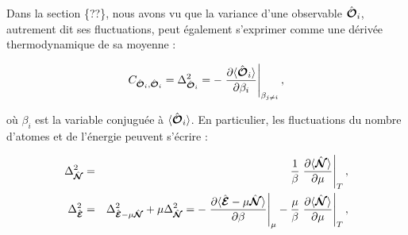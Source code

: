 


Dans la section \{??\}, nous avons vu que la variance d’une observable \( \hat{\bm{\mathcal{O}}}_i \), autrement dit ses fluctuations, peut également s’exprimer comme une dérivée thermodynamique de sa moyenne :

\begin{eqnarray*}
    C_{\hat{\bm{\mathcal{O}}}_i,\hat{\bm{\mathcal{O}}}_i} = \Delta_{\hat{\bm{\mathcal{O}}}_i}^2 = - \left. \frac{\partial \langle \hat{\bm{\mathcal{O}}}_i \rangle}{\partial \beta_i} \right|_{\beta_{j \neq i}},
\end{eqnarray*}

où \( \beta_i \) est la variable conjuguée à \( \langle \hat{\bm{\mathcal{O}}}_i \rangle \). En particulier, les fluctuations du nombre d’atomes et de l’énergie peuvent s’écrire :

\begin{eqnarray*}
    \Delta_{\hat{\bm{\mathcal{N}}}}^2 &=& \frac{1}{\beta} \left. \frac{\partial \langle \hat{\bm{\mathcal{N}}} \rangle}{\partial \mu} \right|_T, \\
    \Delta_{\hat{\bm{\mathcal{E}}}}^2 &=& \Delta_{\hat{\bm{\mathcal{E}}} - \mu \hat{\bm{\mathcal{N}}}}^2 + \mu \Delta_{\hat{\bm{\mathcal{N}}}}^2 =   - \left. \frac{\partial \langle \hat{\bm{\mathcal{E}}} - \mu \hat{\bm{\mathcal{N}}} \rangle}{\partial \beta} \right|_\mu - \frac{\mu}{\beta} \left. \frac{\partial \langle \hat{\bm{\mathcal{N}}} \rangle}{\partial \mu} \right|_T,
\end{eqnarray*}

